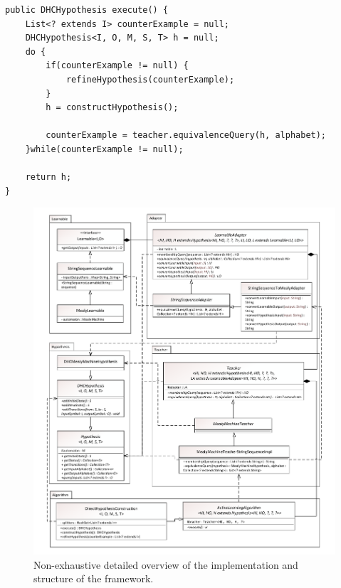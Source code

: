 \begin{lstlisting}[caption=The \emph{execute()} function of the DHC algorithm implementation described in Section \ref{item:stringsequencelearnable}s \emph{DirectHypothesisConstruction} item.,label=li:executedhc]
public DHCHypothesis execute() {
	List<? extends I> counterExample = null;
	DHCHypothesis<I, O, M, S, T> h = null;
	do {
		if(counterExample != null) {
			refineHypothesis(counterExample);
		}
		h = constructHypothesis();
		
		counterExample = teacher.equivalenceQuery(h, alphabet);
	}while(counterExample != null);
	
	return h;
}
\end{lstlisting}

\begin{figure}
	\centering
	\includegraphics[width=1.0\linewidth]{figures/implementationdetailedoverview}
	\caption{Non-exhaustive detailed overview of the implementation and structure of the framework.}
	\label{fig:impldetailedoverview}
\end{figure}
